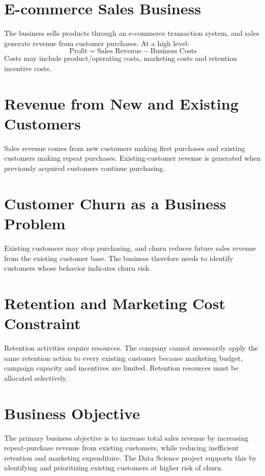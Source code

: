 \section{E-commerce Sales Business}
\label{sec:2-1}

The business sells products through an e-commerce transaction system, and sales generate revenue from customer purchases. At a high level:
\begin{equation*}
    \text{Profit} = \text{Sales Revenue} - \text{Business Costs}
\end{equation*}
Costs may include product/operating costs, marketing costs and retention incentive costs.

\section{Revenue from New and Existing Customers}
\label{sec:2-2}

Sales revenue comes from new customers making first purchases and existing customers making repeat purchases. Existing-customer revenue is generated when previously acquired customers continue purchasing.

\section{Customer Churn as a Business Problem}
\label{sec:2-3}

Existing customers may stop purchasing, and churn reduces future sales revenue from the existing customer base. The business therefore needs to identify customers whose behavior indicates churn risk.

\section{Retention and Marketing Cost Constraint}
\label{sec:2-4}

Retention activities require resources. The company cannot necessarily apply the same retention action to every existing customer because marketing budget, campaign capacity and incentives are limited. Retention resources must be allocated selectively.

\section{Business Objective}
\label{sec:2-5}

The primary business objective is to increase total sales revenue by increasing repeat-purchase revenue from existing customers, while reducing inefficient retention and marketing expenditure. The Data Science project supports this by identifying and prioritizing existing customers at higher risk of churn.

